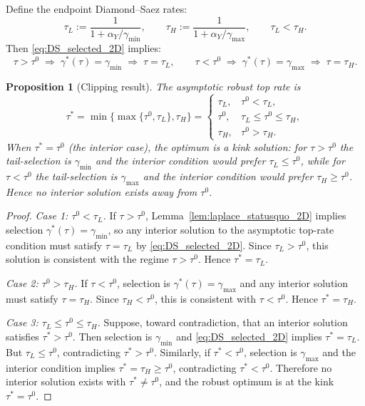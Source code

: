 \documentclass[12pt,a4paper]{article}
\theoremstyle{definition}
\theoremstyle{plain}
\newtheorem{proposition}{Proposition}[section]
\theoremstyle{remark}
\begin{document}
Define the endpoint Diamond--Saez rates:
\begin{equation}
\label{eq:tauLH_2D}
  \tau_L := \frac{1}{1+\alpha_Y/\gamma_{\min}}, \qquad \tau_H := \frac{1}{1+\alpha_Y/\gamma_{\max}}, \qquad \tau_L < \tau_H.
\end{equation}
Then \eqref{eq:DS_selected_2D} implies:
\[
  \tau > \tau^0 \;\Rightarrow\; \gamma^*(\tau) = \gamma_{\min} \;\Rightarrow\; \tau = \tau_L, \qquad
  \tau < \tau^0 \;\Rightarrow\; \gamma^*(\tau) = \gamma_{\max} \;\Rightarrow\; \tau = \tau_H.
\]

\begin{proposition}[Clipping result]
\label{prop:clipping_2D}
The asymptotic robust top rate is
\begin{equation}
\label{eq:clipping_2D}
  \tau^* = \min\{\max\{\tau^0,\tau_L\},\tau_H\} =
  \begin{cases}
    \tau_L, & \tau^0 < \tau_L, \\
    \tau^0, & \tau_L \leq \tau^0 \leq \tau_H, \\
    \tau_H, & \tau^0 > \tau_H.
  \end{cases}
\end{equation}
When $\tau^* = \tau^0$ (the interior case), the optimum is a \emph{kink solution}: for $\tau > \tau^0$ the tail-selection is $\gamma_{\min}$ and the interior condition would prefer $\tau_L \leq \tau^0$, while for $\tau < \tau^0$ the tail-selection is $\gamma_{\max}$ and the interior condition would prefer $\tau_H \geq \tau^0$.  Hence no interior solution exists away from $\tau^0$.
\end{proposition}

\begin{proof}
\emph{Case 1: $\tau^0 < \tau_L$.}  If $\tau > \tau^0$, Lemma~\ref{lem:laplace_statusquo_2D} implies selection $\gamma^*(\tau) = \gamma_{\min}$, so any interior solution to the asymptotic top-rate condition must satisfy $\tau = \tau_L$ by \eqref{eq:DS_selected_2D}.  Since $\tau_L > \tau^0$, this solution is consistent with the regime $\tau > \tau^0$.  Hence $\tau^* = \tau_L$.

\emph{Case 2: $\tau^0 > \tau_H$.}  If $\tau < \tau^0$, selection is $\gamma^*(\tau) = \gamma_{\max}$ and any interior solution must satisfy $\tau = \tau_H$.  Since $\tau_H < \tau^0$, this is consistent with $\tau < \tau^0$.  Hence $\tau^* = \tau_H$.

\emph{Case 3: $\tau_L \leq \tau^0 \leq \tau_H$.}  Suppose, toward contradiction, that an interior solution satisfies $\tau^* > \tau^0$.  Then selection is $\gamma_{\min}$ and \eqref{eq:DS_selected_2D} implies $\tau^* = \tau_L$.  But $\tau_L \leq \tau^0$, contradicting $\tau^* > \tau^0$.  Similarly, if $\tau^* < \tau^0$, selection is $\gamma_{\max}$ and the interior condition implies $\tau^* = \tau_H \geq \tau^0$, contradicting $\tau^* < \tau^0$.  Therefore no interior solution exists with $\tau^* \neq \tau^0$, and the robust optimum is at the kink $\tau^* = \tau^0$.
\end{proof}
\end{document}
